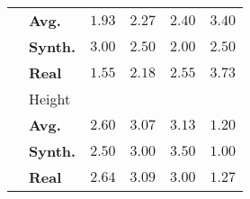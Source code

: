 \begin{table*}[!htbp]
{\begin{tabular}{llrrrr}
		 & \qquad\textbf{Avg.} & $\mathbf{1.93}$ & $2.27$ & $2.40$ & $3.40$\\
		 & \qquad\textbf{Synth.} &  $3.00$ &  $2.50$ &  $\mathbf{2.00}$ &  $2.50$\\
		 & \qquad\textbf{Real} &  $\mathbf{1.55}$ & $2.18$ & $2.55$ & $3.73$\\
		\cmidrule{2-6}
		 & Height &  &  &  & \\
		 & \qquad\textbf{Avg.} & $2.60$ & $3.07$ & $3.13$ & $\mathbf{1.20}$\\
		 & \qquad\textbf{Synth.} &  $2.50$ &  $3.00$ &  $3.50$ &  $\mathbf{1.00}$\\
		 & \qquad\textbf{Real} & $2.64$ & $3.09$ & $3.00$ &  $\mathbf{1.27}$\\
		\bottomrule
	\end{tabular}}
\end{table*}
